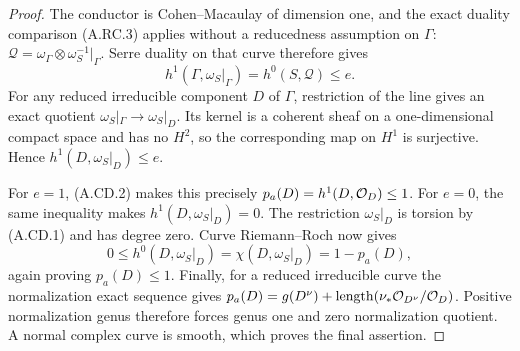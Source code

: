 \begin{proof}
The conductor is Cohen--Macaulay of dimension one,
and the exact duality comparison (A.RC.3) applies
without a reducedness assumption on $\Gamma$:
$\mathcal Q=\omega_\Gamma\otimes\omega_S^{-1}|_\Gamma$.
Serre duality on that curve therefore gives
\[
 h^1(\Gamma,\omega_S|_\Gamma)
       =h^0(S,\mathcal Q)\le e.                   \tag{A.CD.4}
\]
For any reduced irreducible component $D$ of $\Gamma$,
restriction of the line gives an exact quotient
$\omega_S|_\Gamma\to\omega_S|_D$. Its kernel is a
coherent sheaf on a one-dimensional compact space and
has no $H^2$, so the corresponding map on $H^1$ is
surjective. Hence
$h^1(D,\omega_S|_D)\le e$.

For $e=1$, (A.CD.2) makes this precisely
$p_a(D)=h^1(D,\mathcal O_D)\le1$.
For $e=0$, the same inequality makes
$h^1(D,\omega_S|_D)=0$.
The restriction $\omega_S|_D$ is torsion by (A.CD.1)
and has degree zero. Curve Riemann--Roch now gives
\[
 0\le h^0(D,\omega_S|_D)
       =\chi(D,\omega_S|_D)=1-p_a(D),
\]
again proving $p_a(D)\le1$.
Finally, for a reduced irreducible curve the
normalization exact sequence gives
$p_a(D)=g(D^\nu)+\operatorname{length}
(\nu_*\mathcal O_{D^\nu}/\mathcal O_D)$.
Positive normalization genus therefore forces genus
one and zero normalization quotient. A normal complex
curve is smooth, which proves the final assertion.
\end{proof}



